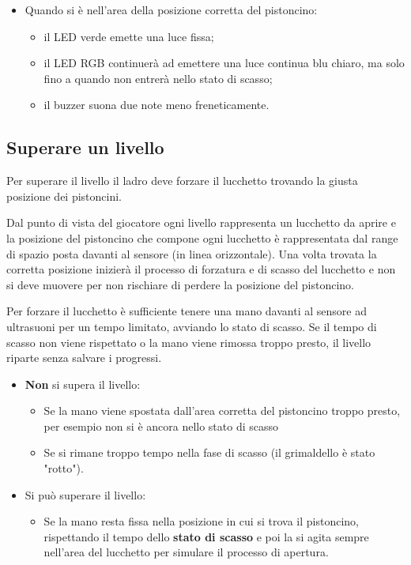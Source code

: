 \begin{itemize}
	\item Quando si è nell'area della posizione corretta del pistoncino:
	\begin{itemize}
		\item il LED verde emette una luce fissa;
		\item il LED RGB continuerà ad emettere una luce continua blu chiaro, ma solo fino a quando non entrerà nello stato di scasso;
		\item il buzzer suona due note meno freneticamente.
	\end{itemize}
\end{itemize}

\subsection{Superare un livello}
Per superare il livello il ladro deve forzare il lucchetto trovando la giusta posizione dei pistoncini.

Dal punto di vista del giocatore ogni livello rappresenta un lucchetto da aprire e la posizione del pistoncino che compone ogni lucchetto è rappresentata dal range di spazio posta davanti al sensore (in linea orizzontale). Una volta trovata la corretta posizione inizierà il processo di forzatura e di scasso del lucchetto e non si deve muovere per non rischiare di perdere la posizione del pistoncino.

Per forzare il lucchetto è sufficiente tenere una mano davanti al sensore ad ultrasuoni per un tempo limitato, avviando lo stato di scasso. Se il tempo di scasso non viene rispettato o la mano viene rimossa troppo presto, il livello riparte senza salvare i progressi.

\begin{itemize}
	\item \textbf{Non} si supera il livello:
	\begin{itemize}
			\item Se la mano viene spostata dall'area corretta del pistoncino troppo presto, per esempio non si è ancora nello stato di scasso
			\item Se si rimane troppo tempo nella fase di scasso (il grimaldello è stato "rotto").
	\end{itemize}
\end{itemize}

\begin{itemize}
	\item Si può superare il livello:
	\begin{itemize}
			\item Se la mano resta fissa nella posizione in cui si trova il pistoncino, rispettando il tempo dello \textbf{stato di scasso} e poi la si agita sempre nell'area del lucchetto per simulare il processo di apertura.
	\end{itemize}
\end{itemize}

